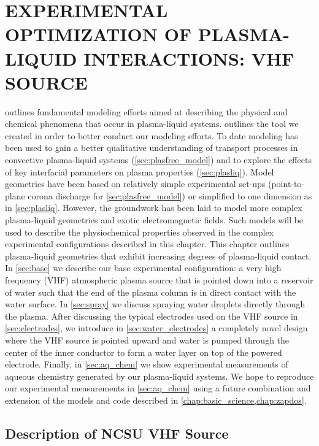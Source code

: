 \chapter{EXPERIMENTAL OPTIMIZATION OF PLASMA-LIQUID INTERACTIONS: VHF SOURCE}
\label{chap:expt_opt}

 outlines fundamental modeling efforts aimed at describing the physical and chemical phenomena that occur in plasma-liquid systems.  outlines the tool we created in order to better conduct our modeling efforts. To date modeling has been used to gain a better qualitative understanding of transport processes in convective plasma-liquid systems (\cref{sec:plasfree_model}) and to explore the effects of key interfacial parameters on plasma properties (\cref{sec:plasliq}). Model geometries have been based on relatively simple experimental set-ups (point-to-plane corona discharge for \cref{sec:plasfree_model}) or simplified to one dimension as in \cref{sec:plasliq}. However, the groundwork has been laid to model more complex plasma-liquid geometries and exotic electromagnetic fields. Such models will be used to describe the physiochemical properties observed in the complex experimental configurations described in this chapter. This chapter outlines plasma-liquid geometries that exhibit increasing degrees of plasma-liquid contact. In \cref{sec:base} we describe our base experimental configuration: a very high frequency (VHF) atmospheric plasma source that is pointed down into a reservoir of water such that the end of the plasma column is in direct contact with the water surface. In \cref{sec:spray} we discuss spraying water droplets directly through the plasma. After discussing the typical electrodes used on the VHF source in \cref{sec:electrodes}, we introduce in \cref{sec:water_electrodes} a completely novel design where the VHF source is pointed upward and water is pumped through the center of the inner conductor to form a water layer on top of the powered electrode. Finally, in \cref{sec:aq_chem} we show experimental measurements of aqueous chemistry generated by our plasma-liquid systems. We hope to reproduce our experimental measurements in \cref{sec:aq_chem} using a future combination and extension of the models and code described in \cref{chap:basic_science,chap:zapdos}.

\section{Description of NCSU VHF Source}
\label{sec:VHF}

